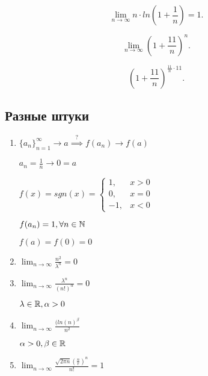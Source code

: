 \begin{enumerate}
    \begin{equation*}
        \lim_{n \to \infty} n \cdot ln(1 + \frac{1}{n}) = 1
    .\end{equation*}

    \begin{equation*}
        \lim_{n \to \infty} (1 + \frac{11}{n})^n
    .\end{equation*}

    \begin{equation*}
        (1 + \frac{11}{n})^{\frac{11}{n} \cdot 11}
    .\end{equation*}
\end{enumerate}

\subsection{Разные штуки}
\begin{enumerate}
\item
    $\{a_n\}_{n = 1}^\infty \to a \overset{?}{\implies} f(a_n) \to f(a)$

    $a_n = \frac{1}{n} \to 0 = a$

    $f(x) = sgn(x) = \begin{cases}
        1, &x > 0 \\
        0, &x = 0 \\
        -1, &x < 0
    \end{cases}$

    $f(a_n) = 1, \forall n \in \mathbb{N}$

    $f(a) = f(0) = 0$

\item
    $\lim_{n \to \infty} \frac{n^2}{\lambda^n} = 0$

\item
    $\lim_{n \to \infty} \frac{\lambda^n}{(n!)^\alpha} = 0$

    $\lambda \in \mathbb{R}, \alpha > 0$

\item
    $\lim_{n \to \infty} \frac{(ln(n)^\beta}{n^2}$

    $\alpha > 0, \beta \in \mathbb{R}$

\item
    $\lim_{n \to \infty} \frac{\sqrt{2 \pi n} (\frac{n}{e})^n}{n!} = 1$
\end{enumerate}

